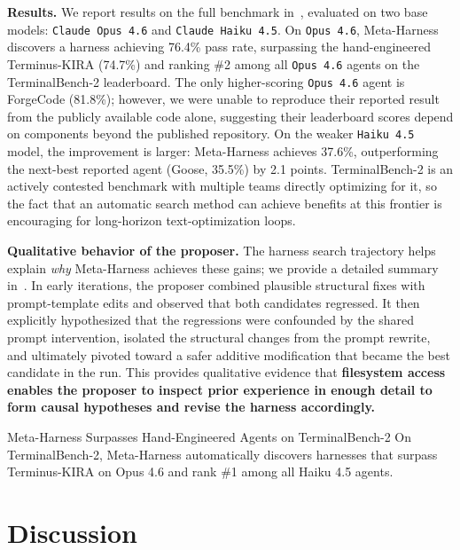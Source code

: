 \textbf{Results.}
We report results on the full benchmark in~, evaluated on two base models: \texttt{Claude Opus 4.6} and \texttt{Claude Haiku 4.5}.
On \texttt{Opus 4.6}, Meta-Harness discovers a harness achieving 76.4\% pass rate, surpassing the hand-engineered Terminus-KIRA (74.7\%) and ranking \#2 among all \texttt{Opus 4.6} agents on the TerminalBench-2 leaderboard.
The only higher-scoring \texttt{Opus 4.6} agent is ForgeCode (81.8\%); however, we were unable to reproduce their reported result from the publicly available code alone, suggesting their leaderboard scores depend on components beyond the published repository.
On the weaker \texttt{Haiku 4.5} model, the improvement is larger: Meta-Harness achieves 37.6\%, outperforming the next-best reported agent (Goose, 35.5\%) by 2.1 points.
TerminalBench-2 is an actively contested benchmark with multiple teams directly optimizing for it, so the fact that an automatic search method can achieve benefits at this frontier is encouraging for long-horizon text-optimization loops.

\textbf{Qualitative behavior of the proposer.}
The harness search trajectory helps explain \textit{why} Meta-Harness achieves these gains; we provide a detailed summary in~.
In early iterations, the proposer combined plausible structural fixes with prompt-template edits and observed that both candidates regressed.
It then explicitly hypothesized that the regressions were confounded by the shared prompt intervention, isolated the structural changes from the prompt rewrite, and ultimately pivoted toward a safer additive modification that became the best candidate in the run.
This provides qualitative evidence that \textbf{filesystem access enables the proposer to inspect prior experience in enough detail to form causal hypotheses and revise the harness accordingly.}

\begin{center}
\begin{takeawaybox}{Meta-Harness Surpasses Hand-Engineered Agents on TerminalBench-2}
On TerminalBench-2, Meta-Harness automatically discovers harnesses that surpass Terminus-KIRA on Opus 4.6 and rank \#1 among all Haiku 4.5 agents.
\end{takeawaybox}
\end{center}

\section{Discussion}
\label{sec:discussion}


